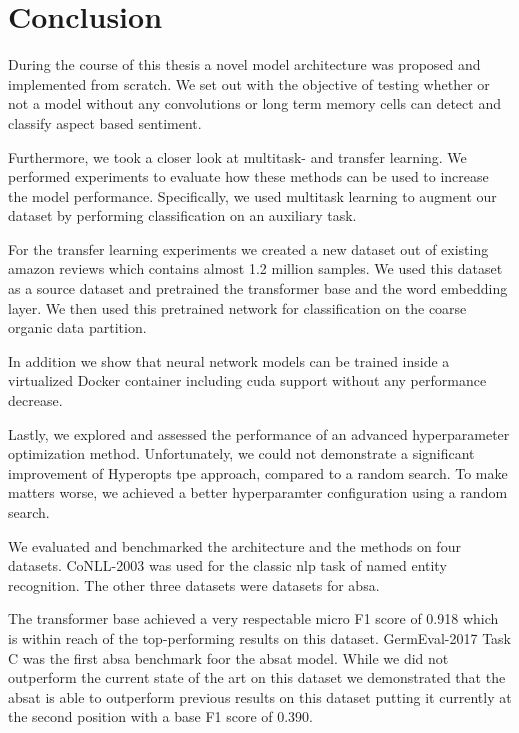 \chapter{Conclusion}
\label{ch:conclusion}
During the course of this thesis a novel model architecture was proposed and implemented from scratch. We set out with the objective of testing whether or not a model without any convolutions or long term memory cells can detect and classify aspect based sentiment.
\medskip

Furthermore, we took a closer look at multitask- and transfer learning. We performed experiments to evaluate how these methods can be used to increase the model performance. Specifically, we used multitask learning to augment our dataset by performing classification on an auxiliary task. 
\smallskip

For the transfer learning experiments we created a new dataset out of existing amazon reviews which contains almost 1.2 million samples. We used this dataset as a source dataset and pretrained the transformer base and the word embedding layer. We then used this pretrained network for classification on the coarse organic data partition.
\medskip

In addition we show that neural network models can be trained inside a virtualized Docker container including \gls{cuda} support without any performance decrease. 
\medskip

Lastly, we explored and assessed the performance of an advanced hyperparameter optimization method. Unfortunately, we could not demonstrate a significant improvement of Hyperopts \gls{tpe} approach, compared to a random search. To make matters worse, we achieved a better hyperparamter configuration using a random search.
\bigskip

We evaluated and benchmarked the architecture and the methods on four datasets. CoNLL-2003 was used for the classic \gls{nlp} task of named entity recognition. The other three datasets were datasets for \gls{absa}.
\medskip

The transformer base achieved a very respectable micro F1 score of 0.918 which is within reach of the top-performing results on this dataset. GermEval-2017 Task C was the first \gls{absa} benchmark foor the \gls{absat} model. While we did not outperform the current state of the art on this dataset we demonstrated that the \gls{absat} is able to outperform previous results on this dataset putting it currently at the second position with a base F1 score of 0.390. 
\medskip

